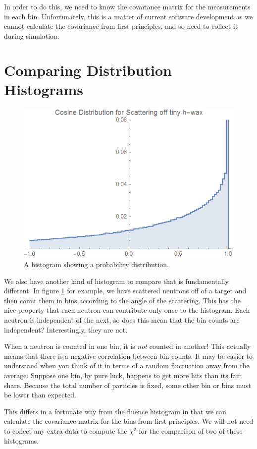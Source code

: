 \documentclass[letterpaper,12pt]{article}
\begin{document}
In order to do this, we need to know the covariance matrix for the measurements in each bin.  Unfortunately, this is a matter of current software development as we cannot calculate the covariance from first principles, and so need to collect it during simulation.

\section{Comparing Distribution Histograms}

\begin{figure}[ht] 
	\centering	\includegraphics[width=0.7\columnwidth]{CosineDistributionMCNP}
	\caption{
		\label{fig.cosine}
		A histogram showing a probability distribution.
	}
\end{figure}

We also have another kind of histogram to compare that is fundamentally different. In figure \ref{fig.cosine} for example, we have scattered neutrons off of a target and then count them in bins according to the angle of the scattering. This has the nice property that each neutron can contribute only once to the histogram. Each neutron is independent of the next, so does this mean that the bin counts are independent? Interestingly, they are not.

When a neutron is counted in one bin, it is \textit{not} counted in another! This actually means that there is a negative correlation between bin counts. It may be easier to understand when you think of it in terms of a random fluctuation away from the average. Suppose one bin, by pure luck, happens to get more hits than its fair share. Because the total number of particles is fixed, some other bin or bins must be lower than expected.

This differs in a fortunate way from the fluence histogram in that we can calculate the covariance matrix for the bins from first principles. We will not need to collect any extra data to compute the $\chi^2$ for the comparison of two of these histograms.
\end{document}
